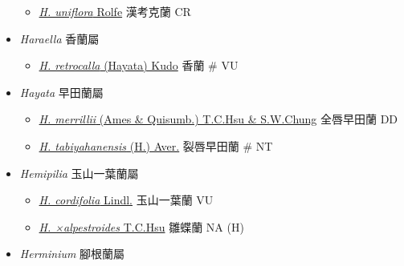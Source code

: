\begin{itemize}
  \begin{itemize}
        \item[] \href{http://www.theplantlist.org/tpl1.1/search?q=Hancockia+uniflora}{\textit{H. uniflora} Rolfe}   漢考克蘭   CR
  \end{itemize}
 \item[] \textit{Haraella} 香蘭屬
                                
  \begin{itemize}
        \item[] \href{http://www.theplantlist.org/tpl1.1/search?q=Haraella+retrocalla}{\textit{H. retrocalla} (Hayata) Kudo}   香蘭  \# VU
  \end{itemize}
 \item[] \textit{Hayata} 早田蘭屬
                                
  \begin{itemize}
        \item[] \href{http://www.theplantlist.org/tpl1.1/search?q=Hayata+merrillii}{\textit{H. merrillii} (Ames \& Quisumb.) T.C.Hsu \& S.W.Chung}   全唇早田蘭   DD
        \item[] \href{http://www.theplantlist.org/tpl1.1/search?q=Hayata+tabiyahanensis}{\textit{H. tabiyahanensis} (H.) Aver.}   裂唇早田蘭  \# NT
  \end{itemize}
 \item[] \textit{Hemipilia} 玉山一葉蘭屬
                                
  \begin{itemize}
        \item[] \href{http://www.theplantlist.org/tpl1.1/search?q=Hemipilia+cordifolia}{\textit{H. cordifolia} Lindl.}   玉山一葉蘭   VU
        \item[] \href{http://www.theplantlist.org/tpl1.1/search?q=Hemipilia+×alpestroides}{\textit{H. ×alpestroides} T.C.Hsu}   雛蝶蘭   NA (H)
  \end{itemize}
 \item[] \textit{Herminium} 腳根蘭屬
                                

\end{itemize}
